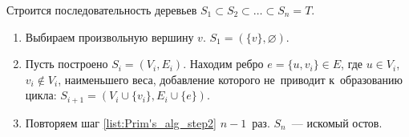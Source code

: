 \begin{enumerate}
	Строится последовательность деревьев $S_1 \subset S_2 \subset \ldots \subset S_n = T$.
	\begin{enumerate}
		\item Выбираем произвольную вершину $v$. $S_1 = (\{ v \}, \varnothing)$.
		\item\label{list:Prim's_alg_step2} Пусть построено $S_i = (V_i, E_i)$.
		Находим ребро $e = \{ u, v_i \} \in E$, где $u \in V_i$, $v_i \notin V_i$, наименьшего веса, добавление которого не~приводит к~образованию цикла: $S_{i+1} = (V_i \cup \{ v_i \}, E_i \cup \{ e \})$.
		\item Повторяем шаг \ref{list:Prim's_alg_step2} $n - 1$~раз.
		$S_n$~--- искомый остов.
	\end{enumerate}
\end{enumerate}